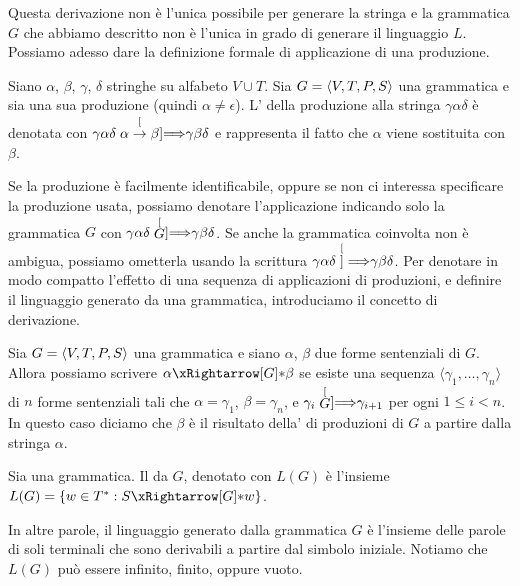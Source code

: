 Questa derivazione non è l'unica possibile per generare la stringa \zero\zero\uno e la grammatica $G$ che abbiamo
descritto non è l'unica in grado di generare il linguaggio $L$.
Possiamo adesso dare la definizione formale di applicazione di una produzione.

\begin{definition}\label{def:applicazione-produzione}
	Siano $\alpha$, $\beta$, $\gamma$, $\delta$ stringhe su alfabeto $V\cup T$.
	Sia $G=\langle V, T, P, S \rangle$ una grammatica e sia \prodgen una sua produzione (quindi $\alpha\neq\epsilon$).
	L' della produzione \prodgen alla stringa $\gamma\alpha\delta$ è denotata con
	$\gamma\alpha\delta \stackrel[{\alpha\to\beta}]{}{\Longrightarrow} \gamma\beta\delta$ e rappresenta il fatto che $\alpha$ viene sostituita con $\beta$.
\end{definition}

Se la produzione \prodgen è facilmente identificabile, oppure se non ci interessa specificare la produzione usata, possiamo denotare l'applicazione indicando solo la grammatica $G$
con $\gamma\alpha\delta \stackrel[G]{}{\Longrightarrow} \gamma\beta\delta$.
Se anche la grammatica coinvolta non è ambigua, possiamo ometterla usando la scrittura $\gamma\alpha\delta \stackrel[]{}{\Longrightarrow} \gamma\beta\delta$.
Per denotare in modo compatto l'effetto di una sequenza di applicazioni di produzioni, e definire il linguaggio generato
da una grammatica, introduciamo il concetto di
derivazione.

\begin{definition}[Derivazione]\label{def:applicazione-produzione-estesa}\label{def:derivazione}
Sia $G=\langle V, T, P, S \rangle$ una grammatica e siano $\alpha$, $\beta$ due forme sentenziali di $G$.
Allora possiamo scrivere $\alpha \eprod{G} \beta$ se esiste una sequenza
$\langle \gamma_{1}, \ldots, \gamma_{n}\rangle $ di $n$ forme sentenziali tali che $\alpha = \gamma_{1}$,
$\beta = \gamma_{n}$, e $\gamma_{i} \stackrel[G]{}{\Longrightarrow} \gamma_{i+1}$ per ogni $1\le i< n$.
In questo caso diciamo che $\beta$ è il risultato della' di produzioni di $G$ a partire dalla stringa $\alpha$.
\end{definition}


\begin{definition}\label{def:linguaggio-generato}
Sia \gramm una grammatica.
Il  da $G$, denotato con $L(G)$ è l'insieme $L(G)= \{ w\in T^{*}: S \eprod{G} w\}$.
\end{definition}

In altre parole, il linguaggio generato dalla grammatica $G$ è l'insieme delle parole di soli terminali che sono
derivabili a partire dal simbolo iniziale.
Notiamo che $L(G)$ può essere infinito, finito, oppure vuoto.


